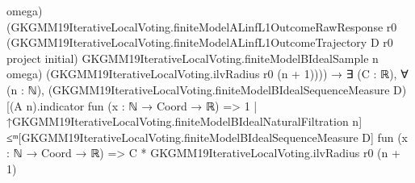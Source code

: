\documentclass[10pt]{article}
\begin{document}
\begin{ReviewVerbatim}
                              omega)
                            (GKGMM19IterativeLocalVoting.finiteModelALinfL1OutcomeRawResponse r0
                              (GKGMM19IterativeLocalVoting.finiteModelALinfL1OutcomeTrajectory D r0 project initial)
                              GKGMM19IterativeLocalVoting.finiteModelBIdealSample n omega)
                            (GKGMM19IterativeLocalVoting.ilvRadius r0 (n + 1)))) →
                  ∃ (C : ℝ),
                    ∀ (n : ℕ),
                      (GKGMM19IterativeLocalVoting.finiteModelBIdealSequenceMeasure
                            D)[(A n).indicator fun (x : ℕ → Coord → ℝ) => 1 |
                          ↑GKGMM19IterativeLocalVoting.finiteModelBIdealNaturalFiltration
                            n] ≤ᵐ[GKGMM19IterativeLocalVoting.finiteModelBIdealSequenceMeasure D]
                        fun (x : ℕ → Coord → ℝ) => C * GKGMM19IterativeLocalVoting.ilvRadius r0 (n + 1)
\end{ReviewVerbatim}
\end{document}
